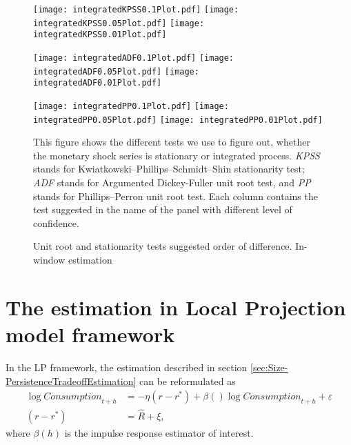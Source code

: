 \documentclass[12pt]{article}
\begin{document}
\begin{figure}[!htbp]\centering
    \begin{minipage}{\textwidth}
    \caption{Unit root and stationarity tests suggested order of difference. In-window estimation}
    \vspace{1.5ex}
    \begin{minipage}{\textwidth}
        \texttt{[image: integratedKPSS0.1Plot.pdf]}
        \texttt{[image: integratedKPSS0.05Plot.pdf]}
        \texttt{[image: integratedKPSS0.01Plot.pdf]}
    \end{minipage}
    \begin{minipage}{\textwidth}
        \texttt{[image: integratedADF0.1Plot.pdf]}
        \texttt{[image: integratedADF0.05Plot.pdf]}
        \texttt{[image: integratedADF0.01Plot.pdf]}
    \end{minipage}
    \begin{minipage}{\textwidth}
        \texttt{[image: integratedPP0.1Plot.pdf]}
        \texttt{[image: integratedPP0.05Plot.pdf]}
        \texttt{[image: integratedPP0.01Plot.pdf]}
    \end{minipage}
    \vspace{1ex}
    \begin{flushleft}\scriptsize
        This figure shows the different tests we use to figure out, whether the monetary shock series is stationary or integrated process.
        \emph{KPSS} stands for Kwiatkowski–Phillips–Schmidt–Shin stationarity test; \emph{ADF} stands for Argumented Dickey-Fuller unit root test,  and \emph{PP} stands for Phillips–Perron unit root test. Each column contains the test suggested in the name of the panel with different level of confidence.
    \end{flushleft}
\end{minipage}
\end{figure}


\section{The estimation in Local Projection model framework}

\citet{Jorda2005}


In the LP framework, the estimation described in section \ref{sec:Size-PersistenceTradeoffEstimation} can be reformulated as 
\begin{align}
    \log\textit{Consumption}_{t+h}&=-\eta (r-r^*)+\beta()\log\textit{Consumption}_{t+h}+\varepsilon\\
    (r-r^*)&=\hat{R}+\xi,
\end{align}
where $\beta(h)$ is the impulse response estimator of interest.
\end{document}

